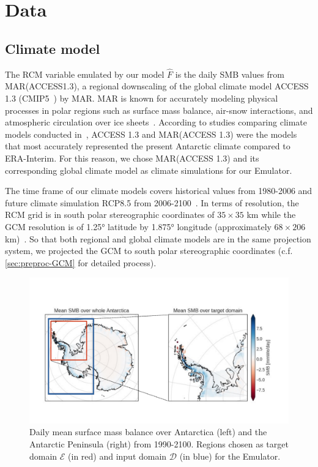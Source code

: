 \documentclass[a4paper,11pt,oneside]{report}
\begin{document}
\section{Data}\label{sec:data}
\subsection{Climate model}
The RCM variable emulated by our model $\hat{F}$ is the daily SMB values from MAR(ACCESS1.3), a regional downscaling of the global climate model ACCESS 1.3 (CMIP5~\cite{ACCESS13, CMIP5}) by MAR. MAR is known for accurately modeling physical processes in polar regions such as surface mass balance, air-snow interactions, and atmospheric circulation over ice sheets~\cite{MAR}. According to studies comparing climate models conducted in~\cite{Kittel, Agosta2015}, ACCESS 1.3 and MAR(ACCESS 1.3) were the models that most accurately represented the present Antarctic climate compared to ERA-Interim. For this reason, we chose MAR(ACCESS 1.3) and its corresponding global climate model as climate simulations for our Emulator. 

The time frame of our climate models covers historical values from 1980-2006 and future climate simulation RCP8.5 from 2006-2100~\cite{Moss2010}. In terms of resolution, the RCM grid is in south polar stereographic coordinates of $35 \times 35$ \si{km} while the GCM resolution is of 1.25° latitude by 1.875° longitude (approximately $68 \times 206$ \si{km})~\cite{ACCESS13, ACCESS13_2}. So that both regional and global climate models are in the same projection system, we projected the GCM to south polar stereographic coordinates (c.f. \autoref{sec:preproc-GCM} for detailed process). 

\begin{figure}[!t]
  \centering
  \includegraphics[width=\columnwidth]{images/domains.pdf}
  \caption []{\small Daily mean surface mass balance over Antarctica (left) and the Antarctic Peninsula (right) from 1990-2100. Regions chosen as target domain $\mathcal{E}$ (in red) and input domain $\mathcal{D}$ (in blue) for the Emulator.}
  \vspace{-3mm}
    \label{fig:region-of-choice}
\end{figure}
\end{document}
